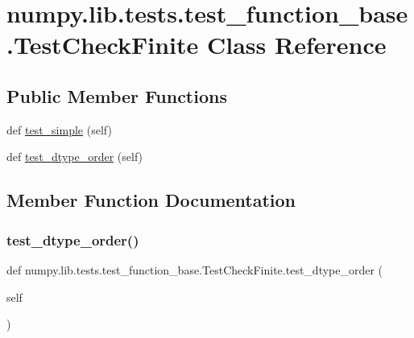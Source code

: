 \hypertarget{classnumpy_1_1lib_1_1tests_1_1test__function__base_1_1TestCheckFinite}{}\section{numpy.\+lib.\+tests.\+test\+\_\+function\+\_\+base.\+Test\+Check\+Finite Class Reference}
\label{classnumpy_1_1lib_1_1tests_1_1test__function__base_1_1TestCheckFinite}
\subsection*{Public Member Functions}
\begin{DoxyCompactItemize}
\item 
def \hyperlink{classnumpy_1_1lib_1_1tests_1_1test__function__base_1_1TestCheckFinite_ad4af6b1023e07cdf729080ad6523e079}{test\+\_\+simple} (self)
\item 
def \hyperlink{classnumpy_1_1lib_1_1tests_1_1test__function__base_1_1TestCheckFinite_abfdd406c33406a48fdbd259b92a9dd28}{test\+\_\+dtype\+\_\+order} (self)
\end{DoxyCompactItemize}


\subsection{Member Function Documentation}
\mbox{\label{classnumpy_1_1lib_1_1tests_1_1test__function__base_1_1TestCheckFinite_abfdd406c33406a48fdbd259b92a9dd28}} 
\subsubsection{\texorpdfstring{test\+\_\+dtype\+\_\+order()}{test\_dtype\_order()}}
{\footnotesize\ttfamily def numpy.\+lib.\+tests.\+test\+\_\+function\+\_\+base.\+Test\+Check\+Finite.\+test\+\_\+dtype\+\_\+order (\begin{DoxyParamCaption}\item[{}]{self }\end{DoxyParamCaption})}

